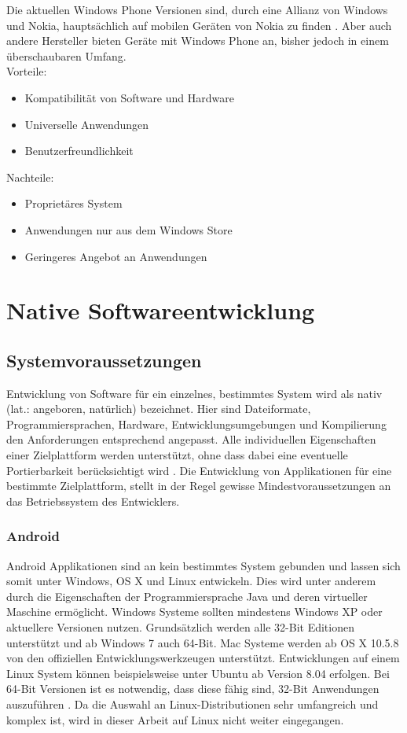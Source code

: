Die aktuellen Windows Phone Versionen sind, durch eine Allianz von Windows und Nokia, hauptsächlich auf mobilen Geräten von Nokia zu finden \citep{microsoft_nokia}.
Aber auch andere Hersteller bieten Geräte mit Windows Phone an, bisher jedoch in einem überschaubaren Umfang.
\\

Vorteile:
\begin{itemize}
	\item Kompatibilität von Software und Hardware
	\item Universelle Anwendungen
	\item Benutzerfreundlichkeit
\end{itemize}

Nachteile:
\begin{itemize}
	\item Proprietäres System
	\item Anwendungen nur aus dem Windows Store
	\item Geringeres Angebot an Anwendungen
\end{itemize}


\chapter{Native Softwareentwicklung}

\section{Systemvoraussetzungen}
Entwicklung von Software für ein einzelnes, bestimmtes System wird als nativ (lat.: angeboren, natürlich) bezeichnet. Hier sind Dateiformate, Programmiersprachen, Hardware, Entwicklungsumgebungen und Kompilierung den Anforderungen entsprechend angepasst. Alle individuellen Eigenschaften einer Zielplattform werden unterstützt, ohne dass dabei eine eventuelle Portierbarkeit berücksichtigt wird \citep{native_software}.
Die Entwicklung von Applikationen für eine bestimmte Zielplattform, stellt in der Regel gewisse Mindestvoraussetzungen an das Betriebssystem des Entwicklers.


\subsection{Android}
Android Applikationen sind an kein bestimmtes System gebunden und lassen sich somit unter Windows, OS X und Linux entwickeln. Dies wird unter anderem durch die Eigenschaften der Programmiersprache Java und deren virtueller Maschine ermöglicht.
Windows Systeme sollten mindestens Windows XP oder aktuellere Versionen nutzen. Grundsätzlich werden alle 32-Bit Editionen unterstützt und ab Windows 7 auch 64-Bit.
Mac Systeme werden ab OS X 10.5.8 von den offiziellen Entwicklungswerkzeugen unterstützt.
Entwicklungen auf einem Linux System können beispielsweise unter Ubuntu ab Version 8.04 erfolgen. Bei 64-Bit Versionen ist es notwendig, dass diese fähig sind, 32-Bit Anwendungen auszuführen \citep{android_sdk_requirements}. Da die Auswahl an Linux-Distributionen sehr umfangreich und komplex ist, wird in dieser Arbeit auf Linux nicht weiter eingegangen.


